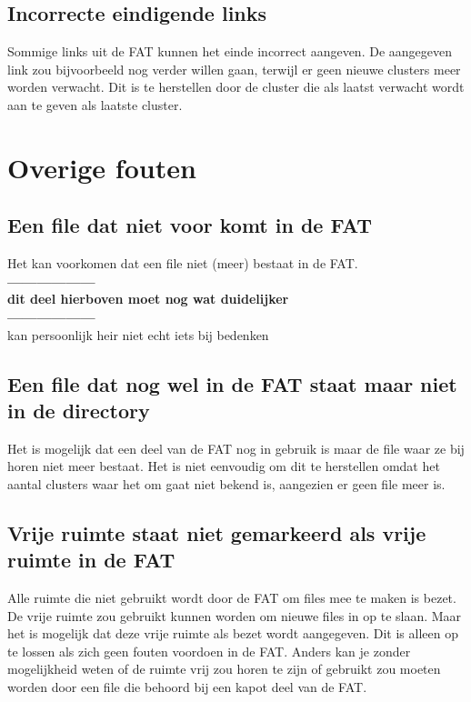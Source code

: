 \documentclass[11pt]{article}
\begin{document}
	\subsection{Incorrecte eindigende links}\label{sec:links}
	Sommige links uit de FAT kunnen het einde incorrect aangeven. De aangegeven link zou bijvoorbeeld nog verder willen gaan, terwijl er geen nieuwe clusters meer worden verwacht. Dit is te herstellen door de cluster die als laatst verwacht wordt aan te geven als laatste cluster.

	\newpage

	\section{Overige fouten}\label{sec:overige}
	\subsection{Een file dat niet voor komt in de FAT}\label{sec:dir}
	Het kan voorkomen dat een file niet (meer) bestaat in de FAT.\\
\textbf{------------------\\dit deel hierboven moet nog wat duidelijker \\------------------}\\
kan persoonlijk heir niet echt iets bij bedenken 

	\subsection{Een file dat nog wel in de FAT staat maar niet in de directory}\label{sec:fat}
	Het is mogelijk dat een deel van de FAT nog in gebruik is maar de file waar ze bij horen niet meer bestaat. Het is niet eenvoudig om dit te herstellen omdat het aantal clusters waar het om gaat niet bekend is, aangezien er geen file meer is.

	\subsection{Vrije ruimte staat niet gemarkeerd als vrije ruimte in de FAT}\label{sec:vrij}
	Alle ruimte die niet gebruikt wordt door de FAT om files mee te maken is bezet. De vrije ruimte zou gebruikt kunnen worden om nieuwe files in op te slaan. Maar het is mogelijk dat deze vrije ruimte als bezet wordt aangegeven. Dit is alleen op te lossen als zich geen fouten voordoen in de FAT. Anders kan je zonder mogelijkheid weten of de ruimte vrij zou horen te zijn of gebruikt zou moeten worden door een file die behoord bij een kapot deel van de FAT.
\end{document}
